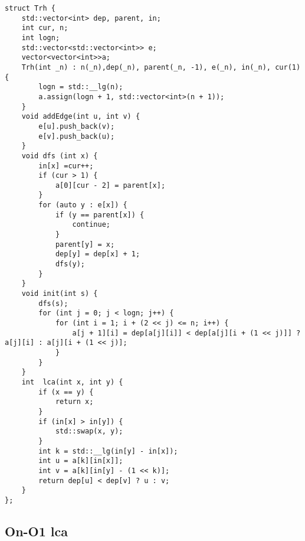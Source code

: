 \documentclass[a4paper,10pt]{article}
\begin{document}
\noindent\begin{lstlisting}
struct Trh {
    std::vector<int> dep, parent, in;
    int cur, n;
    int logn;
    std::vector<std::vector<int>> e;
    vector<vector<int>>a;
    Trh(int _n) : n(_n),dep(_n), parent(_n, -1), e(_n), in(_n), cur(1) {
        logn = std::__lg(n);
        a.assign(logn + 1, std::vector<int>(n + 1));
    }
    void addEdge(int u, int v) {
        e[u].push_back(v);
        e[v].push_back(u);
    }
    void dfs (int x) {
        in[x] =cur++;
        if (cur > 1) {
            a[0][cur - 2] = parent[x];
        }
        for (auto y : e[x]) {
            if (y == parent[x]) {
                continue;
            }
            parent[y] = x;
            dep[y] = dep[x] + 1;
            dfs(y);
        }
    }
    void init(int s) {
        dfs(s);
        for (int j = 0; j < logn; j++) {
            for (int i = 1; i + (2 << j) <= n; i++) {
                a[j + 1][i] = dep[a[j][i]] < dep[a[j][i + (1 << j)]] ? a[j][i] : a[j][i + (1 << j)];
            }
        }
    }
    int  lca(int x, int y) {
        if (x == y) {
            return x;
        }
        if (in[x] > in[y]) {
            std::swap(x, y);
        }
        int k = std::__lg(in[y] - in[x]);
        int u = a[k][in[x]];
        int v = a[k][in[y] - (1 << k)];
        return dep[u] < dep[v] ? u : v;
    }
};\end{lstlisting}

\subsection{On-O1 lca}
\thispagestyle{fancy}
\end{document}
